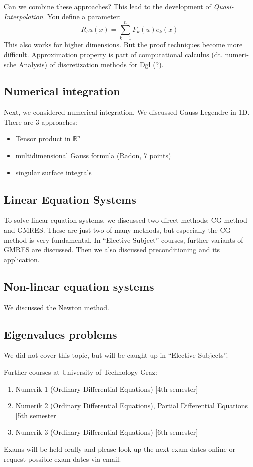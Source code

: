 \documentclass{article}
\begin{document}
Can we combine these approaches? This lead to the development of \emph{Quasi-Interpolation}. You define a parameter:
\[ R_b u(x) = \sum_{k=1}^n F_k(u) e_k(x) \]
This also works for higher dimensions. But the proof techniques become more difficult.
Approximation property is part of computational calculus (dt. \foreignlanguage{ngerman}{numerische Analysis}) of discretization methods for Dgl (?).

\subsection{Numerical integration}

Next, we considered numerical integration.
We discussed Gauss-Legendre in 1D. There are 3 approaches:
\begin{itemize}
  \item Tensor product in $\mathbb R^n$
  \item multidimensional Gauss formula (Radon, 7 points)
  \item singular surface integrals
\end{itemize}

\subsection{Linear Equation Systems}

To solve linear equation systems, we discussed two direct methods: CG method and GMRES. These are just two of many methods, but especially the CG method is very fundamental. In \enquote{Elective Subject} courses, further variants of GMRES are discussed. Then we also discussed preconditioning and its application.

\subsection{Non-linear equation systems}

We discussed the Newton method.

\subsection{Eigenvalues problems}

We did not cover this topic, but will be caught up in \enquote{Elective Subjects}.

Further courses at University of Technology Graz:
\begin{enumerate}
  \item Numerik 1 (Ordinary Differential Equations) [4th semester]
  \item Numerik 2 (Ordinary Differential Equations), Partial Differential Equations [5th semester]
  \item Numerik 3 (Ordinary Differential Equations) [6th semester]
\end{enumerate}

Exams will be held orally and please look up the next exam dates online or request possible exam dates via email.

\end{document}
